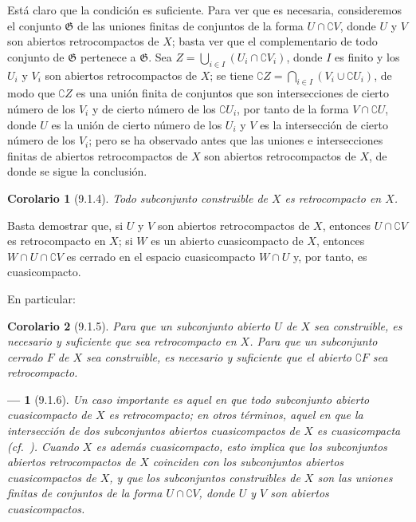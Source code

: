\documentclass[10pt,oneside,openany]{book}
\theoremstyle{egaenv}\newtheorem*{env}{---}
\theoremstyle{egastatement}
\newtheorem*{corollary}{Corolario}
\theoremstyle{egadescription}
\newcommand{\oldpage}[2][]{\marginnote{\normalfont\scriptsize\textbf{#1}\,|\,#2}\ignorespaces}
\begin{document}
Está claro que la condición es suficiente.
Para ver que es necesaria, consideremos el conjunto $\mathfrak{G}$ de las uniones finitas de conjuntos de la forma $U\cap\complement{V}$, donde $U$ y $V$ son abiertos retrocompactos de $X$; basta ver que el complementario de todo conjunto de $\mathfrak{G}$ pertenece a $\mathfrak{G}$.
Sea $Z=\bigcup_{i\in I}(U_i\cap\complement{V_i})$, donde $I$ es finito y los $U_i$ y $V_i$ son abiertos retrocompactos de $X$; se tiene
$\complement{Z}=\bigcap_{i\in I}(V_i\cup\complement{U_i})$, de modo que $\complement{Z}$ es una unión finita de conjuntos que son intersecciones de cierto número de los $V_i$ y de cierto número de los $\complement{U_i}$, por tanto de la forma
\oldpage[0\textsubscript{III}]{13}
$V\cap\complement{U}$, donde $U$ es la unión de cierto número de los $U_i$ y $V$ es la intersección de cierto número de los $V_i$; pero se ha observado antes que las uniones e intersecciones finitas de abiertos retrocompactos de $X$ son abiertos retrocompactos de $X$, de donde se sigue la conclusión.


\begin{corollary}[9.1.4]
\label{0.9.1.4}
\label{0.9.1.4-fr}
Todo subconjunto construible de $X$ es retrocompacto en $X$.
\end{corollary}


Basta demostrar que, si $U$ y $V$ son abiertos retrocompactos de $X$, entonces $U\cap\complement{V}$ es retrocompacto en $X$; si $W$ es un abierto cuasicompacto de $X$, entonces $W\cap U\cap\complement{V}$ es cerrado en el espacio cuasicompacto $W\cap U$ y, por tanto, es cuasicompacto.


En particular:
\begin{corollary}[9.1.5]
\label{0.9.1.5}
\label{0.9.1.5-fr}
Para que un subconjunto abierto $U$ de $X$ sea construible, es necesario y suficiente que sea retrocompacto en $X$.
Para que un subconjunto cerrado $F$ de $X$ sea construible, es necesario y suficiente que el abierto $\complement{F}$ sea retrocompacto.
\end{corollary}

\begin{env}[9.1.6]
\label{0.9.1.6}
\label{0.9.1.6-fr}
Un caso importante es aquel en que todo subconjunto abierto cuasicompacto de $X$ es retrocompacto; en otros términos, aquel en que la intersección de dos subconjuntos abiertos cuasicompactos de $X$ es cuasicompacta (cf.~).
Cuando $X$ es además cuasicompacto, esto implica que los subconjuntos abiertos retrocompactos de $X$ coinciden con los subconjuntos abiertos cuasicompactos de $X$, y que los subconjuntos construibles de $X$ son las uniones finitas de conjuntos de la forma $U\cap\complement{V}$, donde $U$ y $V$ son abiertos cuasicompactos.
\end{env}
\end{document}

